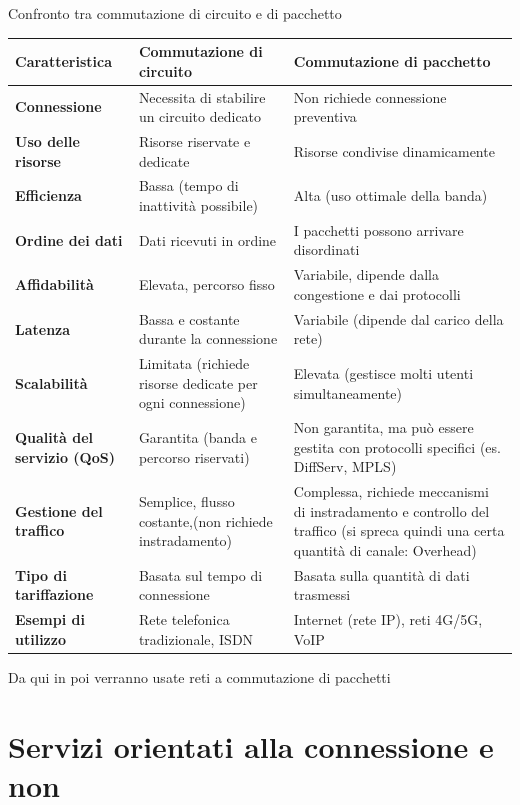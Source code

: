 \documentclass[a4paper,12pt]{report}
\renewcommand{\arraystretch}{1.2} %
\begin{document}
\vspace{1em}
\begin{esempiobox}{Confronto tra commutazione di circuito e di pacchetto}
\renewcommand{\arraystretch}{1.3}
\setlength{\tabcolsep}{8pt}
\begin{tabularx}{\linewidth}{>{\bfseries}p{4cm} X X}
\hline
\textbf{Caratteristica} & \textbf{Commutazione di circuito} & \textbf{Commutazione di pacchetto} \\
\hline
Connessione & Necessita di stabilire un circuito dedicato & Non richiede connessione preventiva \\
Uso delle risorse & Risorse riservate e dedicate & Risorse condivise dinamicamente \\
Efficienza & Bassa (tempo di inattività possibile) & Alta (uso ottimale della banda) \\
Ordine dei dati & Dati ricevuti in ordine & I pacchetti possono arrivare disordinati \\
Affidabilità & Elevata, percorso fisso & Variabile, dipende dalla congestione e dai protocolli \\
Latenza & Bassa e costante durante la connessione & Variabile (dipende dal carico della rete) \\
Scalabilità & Limitata (richiede risorse dedicate per ogni connessione) & Elevata (gestisce molti utenti simultaneamente) \\
Qualità del servizio (QoS) & Garantita (banda e percorso riservati) & Non garantita, ma può essere gestita con protocolli specifici (es. DiffServ, MPLS) \\
Gestione del traffico & Semplice, flusso costante,(non richiede instradamento) & Complessa, richiede meccanismi di instradamento e controllo del traffico (si spreca quindi una certa quantità di canale: Overhead)\\
Tipo di tariffazione & Basata sul tempo di connessione & Basata sulla quantità di dati trasmessi \\

Esempi di utilizzo & Rete telefonica tradizionale, ISDN & Internet (rete IP), reti 4G/5G, VoIP \\
\hline
\end{tabularx}
\end{esempiobox}

\begin{notebox}{}
    Da qui in poi verranno usate reti a commutazione di pacchetti
\end{notebox}


\newpage
\section{Servizi orientati alla connessione e non}
\end{document}
